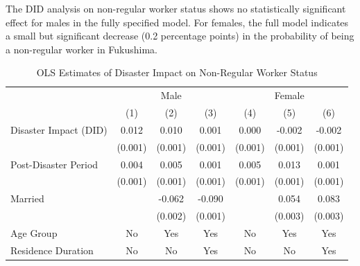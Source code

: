 \documentclass[serif, aspectratio=169]{beamer}
\begin{document}
\begin{frame}

The DID analysis on non-regular worker status shows no statistically significant effect for males in the fully specified model. For females, the full model indicates a small but significant decrease (0.2 percentage points) in the probability of being a non-regular worker in Fukushima.

\begin{table}[htbp]
\centering
\caption{OLS Estimates of Disaster Impact on Non-Regular Worker Status}

\vspace{-0.2cm}


\begin{tabular}{@{}l*{6}{c}@{}}
          &\multicolumn{3}{c}{Male}                                &\multicolumn{3}{c}{Female}                              \\\cmidrule(lr){2-4}\cmidrule(lr){5-7}
          &\multicolumn{1}{c}{(1)}         &\multicolumn{1}{c}{(2)}         &\multicolumn{1}{c}{(3)}         &\multicolumn{1}{c}{(4)}         &\multicolumn{1}{c}{(5)}         &\multicolumn{1}{c}{(6)}         \\
\toprule
Disaster Impact (DID)&    0.012\sym{***}&    0.010\sym{***}&    0.001         &    0.000         &   -0.002\sym{**} &   -0.002\sym{**} \\
          &  (0.001)         &  (0.001)         &  (0.001)         &  (0.001)         &  (0.001)         &  (0.001)         \\
\addlinespace
Post-Disaster Period&    0.004\sym{**} &    0.005\sym{***}&    0.001         &    0.005\sym{***}&    0.013\sym{***}&    0.001         \\
          &  (0.001)         &  (0.001)         &  (0.001)         &  (0.001)         &  (0.001)         &  (0.001)         \\
\addlinespace
Married   &                  &   -0.062\sym{***}&   -0.090\sym{***}&                  &    0.054\sym{***}&    0.083\sym{***}\\
          &                  &  (0.002)         &  (0.001)         &                  &  (0.003)         &  (0.003)         \\
\midrule
Age Group &       No         &      Yes         &      Yes         &       No         &      Yes         &      Yes         \\
Residence Duration&       No         &       No         &      Yes         &       No         &       No         &      Yes         \\

\end{tabular}
\end{table}
\end{frame}
\end{document}
